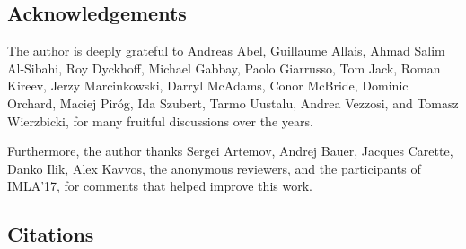 \documentclass{entcs}
\newcommand{\lambdabox}{\lambda^{\mkern-1mu\sq\mkern-2mu}}
\renewcommand{\:}{\mathrel{:}}
\renewcommand{\;}{\mathbin{;}}
\newcommand{\tsf}[1]{\textsf{\upshape{#1}}}
\newcommand{\stsf}[1]{\tsf{\small{#1}}}
\newcommand{\R}{\Rightarrow}
\newcommand{\sq}{\Box}
\renewcommand{\e}{\mathrel{\vdash}}
\newcommand{\lam}{\operatorname{\underline{\lambda}}}
\newcommand{\app}{\mathbin{\$}}
\newcommand{\quo}[1]{\mathopen{\ulcorner}{#1}\mathclose{\urcorner}}
\newcommand{\unquo}[1]{\mathopen{\llcorner}{#1}\mathclose{\lrcorner}\,}
\newcommand{\mvO}{\operatorname{^{\stsf{mv}\mkern-1mu}\tsf{0}}}
\newcommand{\mvI}{\operatorname{^{\stsf{mv}\mkern-1mu}\tsf{1}}}
\newcommand{\vO}{\operatorname{^{\stsf{v}\mkern-1mu}\tsf{0}}}
\newcommand{\vI}{\operatorname{^{\stsf{v}\mkern-1mu}\tsf{1}}}
\newcommand{\bconv}{\mathrel{\sim_{\beta}}}
\newcommand{\Kaxiom}{\operatorname{\tsf{K}}}
\newcommand{\dist}{\operatorname{\tsf{dist}}}
\begin{document}
%
%
%




\subsection*{Acknowledgements}

The author is deeply grateful to Andreas Abel, Guillaume Allais, Ahmad Salim Al-Sibahi, Roy Dyckhoff, Michael Gabbay, Paolo Giarrusso, Tom Jack, Roman Kireev, Jerzy Marcinkowski, Darryl McAdams, Conor McBride, Dominic Orchard, Maciej Pir\'{o}g, Ida Szubert, Tarmo Uustalu, Andrea Vezzosi, and Tomasz Wierzbicki, for many fruitful discussions over the years.

Furthermore, the author thanks Sergei Artemov, Andrej Bauer, Jacques Carette, Danko Ilik, Alex Kavvos, the anonymous reviewers, and the participants of IMLA'17, for comments that helped improve this work.




\subsection*{Citations}
\end{document}
